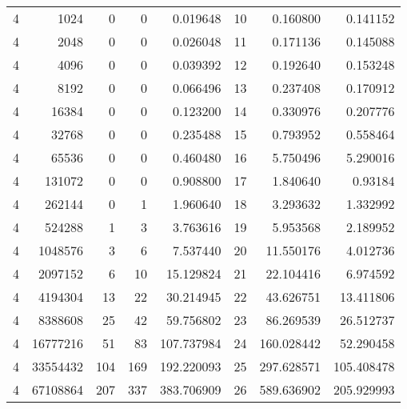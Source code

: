\begin{longtable}[c]{@{}rrrrrrrr@{}}
    4         & 1024      & 0         & 0        & 0.019648    & 10                  & 0.160800    & 0.141152   \\
    4         & 2048      & 0         & 0        & 0.026048    & 11                  & 0.171136    & 0.145088   \\
    4         & 4096      & 0         & 0        & 0.039392    & 12                  & 0.192640    & 0.153248   \\
    4         & 8192      & 0         & 0        & 0.066496    & 13                  & 0.237408    & 0.170912   \\
    4         & 16384     & 0         & 0        & 0.123200    & 14                  & 0.330976    & 0.207776   \\
    4         & 32768     & 0         & 0        & 0.235488    & 15                  & 0.793952    & 0.558464   \\
    4         & 65536     & 0         & 0        & 0.460480    & 16                  & 5.750496    & 5.290016   \\
    4         & 131072    & 0         & 0        & 0.908800    & 17                  & 1.840640    & 0.93184    \\
    4         & 262144    & 0         & 1        & 1.960640    & 18                  & 3.293632    & 1.332992   \\
    4         & 524288    & 1         & 3        & 3.763616    & 19                  & 5.953568    & 2.189952   \\
    4         & 1048576   & 3         & 6        & 7.537440    & 20                  & 11.550176   & 4.012736   \\
    4         & 2097152   & 6         & 10       & 15.129824   & 21                  & 22.104416   & 6.974592   \\
    4         & 4194304   & 13        & 22       & 30.214945   & 22                  & 43.626751   & 13.411806  \\
    4         & 8388608   & 25        & 42       & 59.756802   & 23                  & 86.269539   & 26.512737  \\
    4         & 16777216  & 51        & 83       & 107.737984  & 24                  & 160.028442  & 52.290458  \\
    4         & 33554432  & 104       & 169      & 192.220093  & 25                  & 297.628571  & 105.408478 \\
    4         & 67108864  & 207       & 337      & 383.706909  & 26                  & 589.636902  & 205.929993 \\

\end{longtable}
